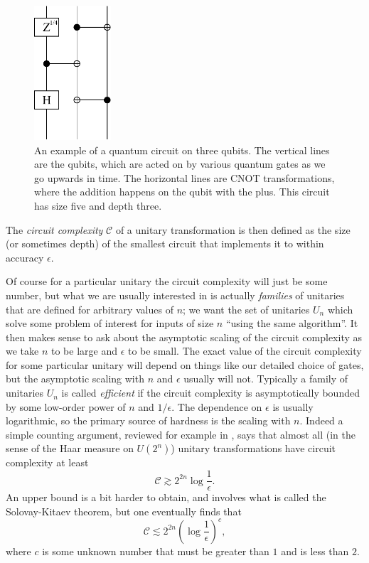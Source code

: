 \documentclass[12pt]{article}
\newcommand{\be}{\begin{equation}}
\newcommand{\ee}{\end{equation}}
\begin{document}
\begin{figure}
\begin{center}
\includegraphics[height=5cm]{circuit1.pdf}
\caption{An example of a quantum circuit on three qubits.  The vertical lines are the qubits, which are acted on by various quantum gates as we go upwards in time.  The horizontal lines are CNOT transformations, where the addition happens on the qubit with the plus.  This circuit has size five and depth three.}\label{circuit1}
\end{center}
\end{figure}
The \textit{circuit complexity} $\mathcal{C}$ of a unitary transformation is then defined as the size (or sometimes depth) of the smallest circuit that implements it to within accuracy $\epsilon$.  

Of course for a particular unitary the circuit complexity will just be some number, but what we are usually interested in is actually \textit{families} of unitaries that are defined for arbitrary values of $n$; we want the set of unitaries $U_n$ which solve some problem of interest for inputs of size $n$  ``using the same algorithm''.  It then makes sense to ask about the asymptotic scaling of the circuit complexity as we take $n$ to be large and $\epsilon$ to be small.  The exact value of the circuit complexity for some particular unitary will depend on things like our detailed choice of gates, but the asymptotic scaling with $n$ and $\epsilon$ usually will not.  Typically a family of unitaries $U_n$ is called \textit{efficient} if the circuit complexity is asymptotically bounded by some low-order power of $n$ and $1/\epsilon$.  The dependence on $\epsilon$ is usually logarithmic, so the primary source of hardness is the scaling with $n$.  Indeed a simple counting argument, reviewed for example in \cite{Harlow:2013tf}, says that almost all (in the sense of the Haar measure on $U(2^n)$) unitary transformations have circuit complexity at least
\be
\mathcal{C}\gtrsim 2^{2n} \log \frac{1}{\epsilon}.
\ee
An upper bound is a bit harder to obtain, and involves what is called the Solovay-Kitaev theorem, but one eventually finds that \cite{nielsen2010quantum}
\be
\mathcal{C}\lesssim 2^{2n} \left(\log\frac{1}{\epsilon}\right)^c,
\ee
where $c$ is some unknown number that must be greater than $1$ and is less than $2$.  
\end{document}
